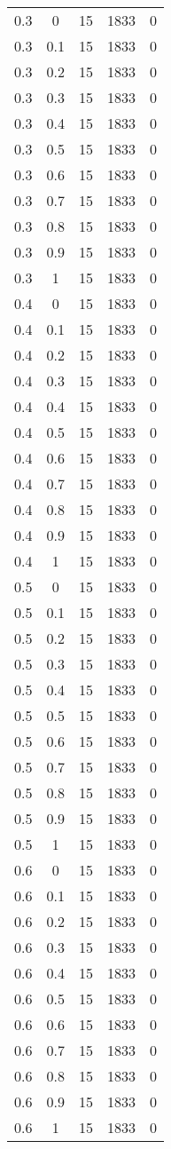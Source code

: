 \begin{longtable}{|c|c|c|c|c|}
	0.3& 0& 15& 1833& 0 \\
	0.3& 0.1& 15& 1833& 0 \\
	0.3& 0.2& 15& 1833& 0 \\
	0.3& 0.3& 15& 1833& 0 \\
	0.3& 0.4& 15& 1833& 0 \\
	0.3& 0.5& 15& 1833& 0 \\
	0.3& 0.6& 15& 1833& 0 \\
	0.3& 0.7& 15& 1833& 0 \\
	0.3& 0.8& 15& 1833& 0 \\
	0.3& 0.9& 15& 1833& 0 \\
	0.3& 1& 15& 1833& 0 \\
	\hline
	
	0.4& 0& 15& 1833& 0 \\
	0.4& 0.1& 15& 1833& 0 \\
	0.4& 0.2& 15& 1833& 0 \\
	0.4& 0.3& 15& 1833& 0 \\
	0.4& 0.4& 15& 1833& 0 \\
	0.4& 0.5& 15& 1833& 0 \\
	0.4& 0.6& 15& 1833& 0 \\
	0.4& 0.7& 15& 1833& 0 \\
	0.4& 0.8& 15& 1833& 0 \\
	0.4& 0.9& 15& 1833& 0 \\
	0.4& 1& 15& 1833& 0 \\
	\hline
	
	0.5& 0& 15& 1833& 0 \\
	0.5& 0.1& 15& 1833& 0 \\
	0.5& 0.2& 15& 1833& 0 \\
	0.5& 0.3& 15& 1833& 0 \\
	0.5& 0.4& 15& 1833& 0 \\
	0.5& 0.5& 15& 1833& 0 \\
	0.5& 0.6& 15& 1833& 0 \\
	0.5& 0.7& 15& 1833& 0 \\
	0.5& 0.8& 15& 1833& 0 \\
	0.5& 0.9& 15& 1833& 0 \\
	0.5& 1& 15& 1833& 0 \\
	\hline
	
	0.6& 0& 15& 1833& 0 \\
	0.6& 0.1& 15& 1833& 0 \\
	0.6& 0.2& 15& 1833& 0 \\
	0.6& 0.3& 15& 1833& 0 \\
	0.6& 0.4& 15& 1833& 0 \\
	0.6& 0.5& 15& 1833& 0 \\
	0.6& 0.6& 15& 1833& 0 \\
	0.6& 0.7& 15& 1833& 0 \\
	0.6& 0.8& 15& 1833& 0 \\
	0.6& 0.9& 15& 1833& 0 \\
	0.6& 1& 15& 1833& 0 \\
	\hline
	

\end{longtable}
